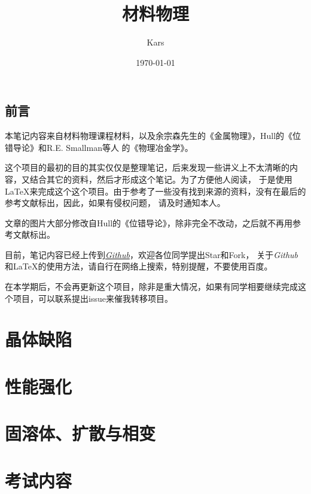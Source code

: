 \documentclass[12pt]{book}
\title{材料物理}
\author{Kars}
\date{\today}
\numberwithin{equation}{section}
\begin{document}
\maketitle



\tableofcontents
{}

\clearpage
\chapter*{前言}
	本笔记内容来自材料物理课程材料，以及余宗森先生的《金属物理》\cite{余宗森1982高等学校教学用书}，Hull的《位错导论》\cite{HULL201143}和R.E. Smallman等人
	的《物理冶金学》\cite{ngan2007physical}。

	这个项目的最初的目的其实仅仅是整理笔记，后来发现一些讲义上不太清晰的内容，又结合其它的资料，然后才形成这个笔记。为了方便他人阅读，
	于是使用\LaTeX 来完成这个这个项目。由于参考了一些没有找到来源的资料，没有在最后的参考文献标出，因此，如果有侵权问题，
	请及时通知本人。

	文章的图片大部分修改自Hull的《位错导论》\cite{HULL2011137}，除非完全不改动，之后就不再用参考文献标出。

	目前，笔记内容已经上传到\href{https://github.com/lkmpoijn/Material_Physics}{\emph{Github}}，欢迎各位同学提出Star和Fork，
	关于\emph{Github}和\LaTeX 的使用方法，请自行在网络上搜索，特别提醒，不要使用百度。

	在本学期后，不会再更新这个项目，除非是重大情况，如果有同学相要继续完成这个项目，可以联系提出issue来催我转移项目。
\part{晶体缺陷}
	
	
	
\part{性能强化}
	
	
	
\part{固溶体、扩散与相变}
	
	
	
\part{考试内容}
	
\printindex
{}


\end{document}
